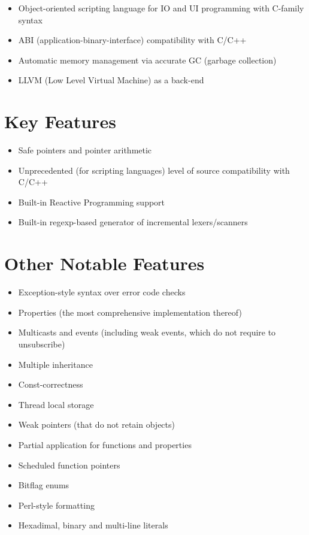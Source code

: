 \documentclass[oneside]{book}
\begin{document}
\begin{itemize}
\item Object-oriented scripting language for IO and UI programming with C-family syntax
\item ABI (application-binary-interface) compatibility with C/C++
\item Automatic memory management via accurate GC (garbage collection)
\item LLVM (Low Level Virtual Machine) as a back-end
\end{itemize}

\section{Key Features}

\begin{itemize}
\item Safe pointers and pointer arithmetic
\item Unprecedented (for scripting languages) level of source compatibility with C/C++ 
\item Built-in Reactive Programming support
\item Built-in regexp-based generator of incremental lexers/scanners
\end{itemize}

\section{Other Notable Features}

\begin{itemize}
\item Exception-style syntax over error code checks
\item Properties (the most comprehensive implementation thereof)
\item Multicasts and events (including weak events, which do not require to unsubscribe)
\item Multiple inheritance
\item Const-correctness
\item Thread local storage
\item Weak pointers (that do not retain objects)
\item Partial application for functions and properties
\item Scheduled function pointers
\item Bitflag enums
\item Perl-style formatting
\item Hexadimal, binary and multi-line literals
\end{itemize}
\end{document}
